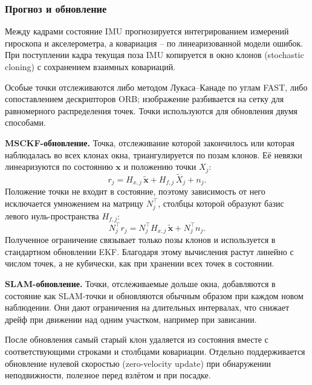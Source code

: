     \subsubsection{Прогноз и обновление}
    Между кадрами состояние IMU прогнозируется интегрированием измерений гироскопа и акселерометра, а ковариация -- по линеаризованной модели ошибок.
    При поступлении кадра текущая поза IMU копируется в окно клонов (stochastic cloning) с сохранением взаимных ковариаций.

    Особые точки отслеживаются либо методом Лукаса--Канаде по углам FAST, либо сопоставлением дескрипторов ORB; изображение разбивается на сетку для равномерного распределения точек.
    Точки используются для обновления двумя способами.

    \textbf{MSCKF-обновление.}
    Точка, отслеживание которой закончилось или которая наблюдалась во всех клонах окна, триангулируется по позам клонов.
    Её невязки линеаризуются по состоянию $\mathbf{x}$ и положению точки $X_j$:
    \begin{equation}\label{eq:msckf_lin}
        r_j = H_{x,j}\, \tilde{\mathbf{x}} + H_{f,j}\, \tilde{X}_j + n_j .
    \end{equation}
    Положение точки не входит в состояние, поэтому зависимость от него исключается умножением на матрицу $N_j^\top$, столбцы которой образуют базис левого нуль-пространства $H_{f,j}$:
    \begin{equation}\label{eq:msckf_null}
        N_j^\top r_j = N_j^\top H_{x,j}\, \tilde{\mathbf{x}} + N_j^\top n_j .
    \end{equation}
    Полученное ограничение связывает только позы клонов и используется в стандартном обновлении EKF.
    Благодаря этому вычисления растут линейно с числом точек, а не кубически, как при хранении всех точек в состоянии.

    \textbf{SLAM-обновление.}
    Точки, отслеживаемые дольше окна, добавляются в состояние как SLAM-точки и обновляются обычным образом при каждом новом наблюдении.
    Они дают ограничения на длительных интервалах, что снижает дрейф при движении над одним участком, например при зависании.

    После обновления самый старый клон удаляется из состояния вместе с соответствующими строками и столбцами ковариации.
    Отдельно поддерживается обновление нулевой скоростью (zero-velocity update) при обнаружении неподвижности, полезное перед взлётом и при посадке.

